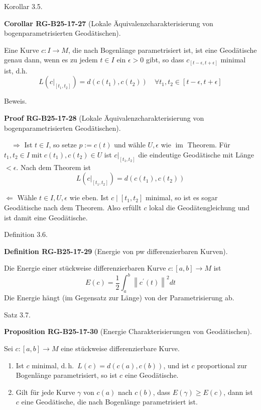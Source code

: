 \documentclass[10pt, letterpaper]{article}
\newcommand{\CustomHeading}[3]{%
  \par\medskip\noindent%
  \textbf{#1 #2} \textnormal{(#3)}.\enskip%
}
\newenvironment{DEF}[2]{\begin{unitbox}\CustomHeading{Definition}{#1}{#2}}{\end{unitbox}}
\newenvironment{PROP}[2]{\begin{unitbox}\CustomHeading{Proposition}{#1}{#2}}{\end{unitbox}}
\newenvironment{KORO}[2]{\begin{unitbox}\CustomHeading{Corollar}{#1}{#2}}{\end{unitbox}}
\newenvironment{PROOF}[2]{\begin{unitbox}\CustomHeading{Proof}{#1}{#2}}{\end{unitbox}}
\begin{document}
Korollar 3.5. 

\begin{KORO}{RG-B25-17-27}{Lokale Äquivalenzcharakterisierung von bogenparametrisierten Geodätischen}
Eine Kurve $c: I \rightarrow M$, die nach Bogenlänge parametrisiert ist, ist eine Geodätische genau dann, wenn es zu jedem $t \in I$ ein $\epsilon>0$ gibt, so dass $c_{[t-\epsilon, t+\epsilon]}$ minimal ist, d.h.
$$
L\left(\left.c\right|_{\left[t_{1}, t_{2}\right]}\right)=d\left(c\left(t_{1}\right), c\left(t_{2}\right)\right) \quad \forall t_{1}, t_{2} \in[t-\epsilon, t+\epsilon]
$$
\end{KORO}



Beweis. 

\begin{PROOF}{RG-B25-17-28}{Lokale Äquivalenzcharakterisierung von bogenparametrisierten Geodätischen}
$\quad \Longrightarrow$ Ist $t \in I$, so setze $p:=c(t)$ und wähle $U, \epsilon$ wie $\operatorname{im}$ Theorem. Für $t_{1}, t_{2} \in I \operatorname{mit} c\left(t_{1}\right), c\left(t_{2}\right) \in U$ ist $\left.c\right|_{\left[t_{1}, t_{2}\right]}$ die eindeutige Geodätische mit Länge $<\epsilon$. Nach dem Theorem ist $$L\left(\left.c\right|_{\left[t_{1}, t_{2}\right]}\right)=d\left(c\left(t_{1}\right), c\left(t_{2}\right)\right)$$

$\Longleftarrow$ Wähle $t \in I, U, \epsilon$ wie eben. Ist $c \mid\left[t_{1}, t_{2}\right]$ minimal, so ist es sogar Geodätische nach dem Theorem. Also erfüllt $c$ lokal die Geodätengleichung und ist damit eine Geodätische.
\end{PROOF}



Definition 3.6. 


\begin{DEF}{RG-B25-17-29}{Energie von pw differenzierbaren Kurven}
Die Energie einer stückweise differenzierbaren Kurve $c:[a, b] \rightarrow M$ ist
$$
E(c)=\frac{1}{2} \int_{a}^{b}\left\|c^{\prime}(t)\right\|^{2} d t
$$
Die Energie hängt (im Gegensatz zur Länge) von der Parametrisierung ab.
\end{DEF}



Satz 3.7. 


\begin{PROP}{RG-B25-17-30}{Energie Charakterisierungen von Geodätischen}
Sei $c:[a, b] \rightarrow M$ eine stückweise differenzierbare Kurve.
\begin{enumerate}
  \item Ist $c$ minimal, d.\,h.\ $L(c) = d(c(a), c(b))$, und ist $c$ proportional zur Bogenlänge parametrisiert, so ist $c$ eine Geodätische.

  \item Gilt für jede Kurve $\gamma$ von $c(a)$ nach $c(b)$, dass $E(\gamma) \geq E(c)$, dann ist $c$ eine Geodätische, die nach Bogenlänge parametrisiert ist.
\end{enumerate}
\end{PROP}
\end{document}
